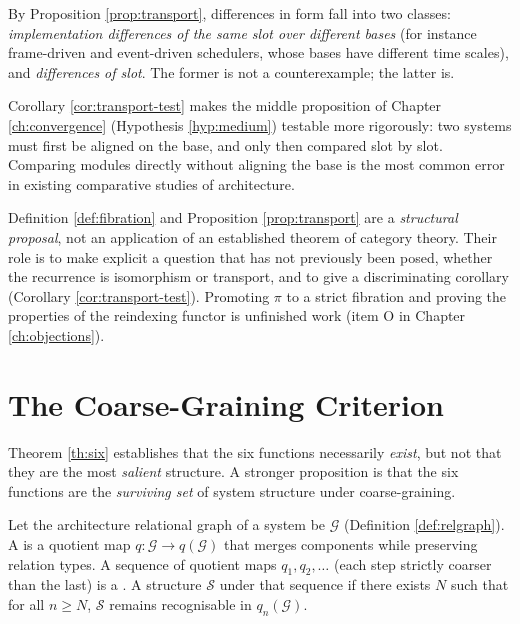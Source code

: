 \begin{corollary}\label{cor:transport-test}
By Proposition \ref{prop:transport}, differences in form fall into two classes:
\emph{implementation differences of the same slot over different bases} (for instance
frame-driven and event-driven schedulers, whose bases have different time scales), and
\emph{differences of slot}. The former is not a counterexample; the latter is.
\end{corollary}

Corollary \ref{cor:transport-test} makes the middle proposition of Chapter
\ref{ch:convergence} (Hypothesis \ref{hyp:medium}) testable more rigorously: two systems
must first be aligned on the base, and only then compared slot by slot. Comparing modules
directly without aligning the base is the most common error in existing comparative studies
of architecture.

\begin{remark}\label{rmk:fibration-status}
Definition \ref{def:fibration} and Proposition \ref{prop:transport} are a \emph{structural
proposal}, not an application of an established theorem of category theory. Their role is to
make explicit a question that has not previously been posed, whether the recurrence is
isomorphism or transport, and to give a discriminating corollary
(Corollary \ref{cor:transport-test}). Promoting $\pi$ to a strict fibration and proving the
properties of the reindexing functor is unfinished work (item O in
Chapter \ref{ch:objections}).
\end{remark}

\section{The Coarse-Graining Criterion}\label{sec:coarsegrain}

Theorem \ref{th:six} establishes that the six functions necessarily \emph{exist}, but not
that they are the most \emph{salient} structure. A stronger proposition is that the six
functions are the \emph{surviving set} of system structure under coarse-graining.

\begin{definition}\label{def:coarsegrain}
Let the architecture relational graph of a system be $\mathcal{G}$
(Definition \ref{def:relgraph}). A  is a quotient map
$q : \mathcal{G} \to q(\mathcal{G})$ that merges components while preserving relation types.
A sequence of quotient maps $q_1, q_2, \dots$ (each step strictly coarser than the last) is
a . A structure $\mathcal{S}$  under that
sequence if there exists $N$ such that for all $n \ge N$, $\mathcal{S}$ remains recognisable
in $q_n(\mathcal{G})$.
\end{definition}

